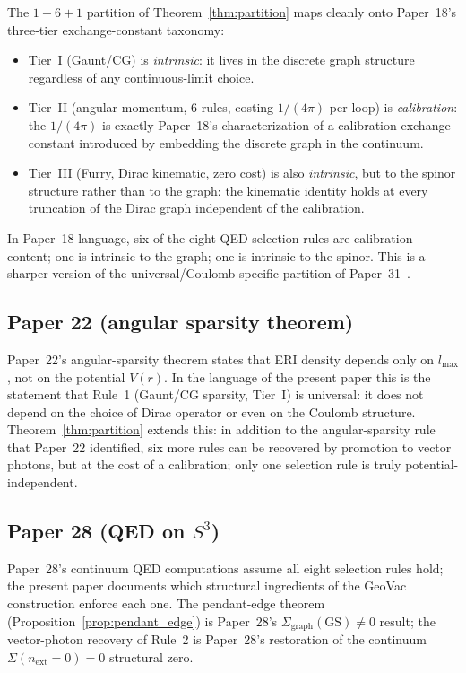 \documentclass[11pt]{article}
\begin{document}
The $1{+}6{+}1$ partition of Theorem~\ref{thm:partition} maps cleanly
onto Paper~18's three-tier exchange-constant taxonomy:

\begin{itemize}\setlength{\itemsep}{2pt}
\item Tier~I (Gaunt/CG) is \emph{intrinsic}: it lives in the discrete
graph structure regardless of any continuous-limit choice.
\item Tier~II (angular momentum, 6 rules, costing $1/(4\pi)$ per
loop) is \emph{calibration}: the $1/(4\pi)$ is exactly Paper~18's
characterization of a calibration exchange constant introduced by
embedding the discrete graph in the continuum.
\item Tier~III (Furry, Dirac kinematic, zero cost) is also
\emph{intrinsic}, but to the spinor structure rather than to the
graph: the kinematic identity holds at every truncation of the Dirac
graph independent of the calibration.
\end{itemize}

In Paper~18 language, six of the eight QED selection rules are
calibration content; one is intrinsic to the graph; one is intrinsic
to the spinor.  This is a sharper version of the
universal/Coulomb-specific partition of Paper~31~\cite{paper31}.

\subsection{Paper 22 (angular sparsity theorem)}

Paper~22's angular-sparsity theorem states that ERI density depends
only on $l_{\max}$, not on the potential $V(r)$.  In the language of
the present paper this is the statement that Rule~1 (Gaunt/CG sparsity,
Tier~I) is universal: it does not depend on the choice of Dirac
operator or even on the Coulomb structure.  Theorem~\ref{thm:partition}
extends this: in addition to the angular-sparsity rule that Paper~22
identified, six more rules can be recovered by promotion to vector
photons, but at the cost of a calibration; only one selection rule is
truly potential-independent.

\subsection{Paper 28 (QED on $S^3$)}

Paper~28's continuum QED computations assume all eight selection rules
hold; the present paper documents which structural ingredients of the
GeoVac construction enforce each one.  The pendant-edge theorem
(Proposition~\ref{prop:pendant_edge}) is Paper~28's
$\Sigma_{\mathrm{graph}}(\mathrm{GS}) \ne 0$ result; the vector-photon
recovery of Rule~2 is Paper~28's restoration of the continuum
$\Sigma(n_{\mathrm{ext}} = 0) = 0$ structural zero.
\end{document}
